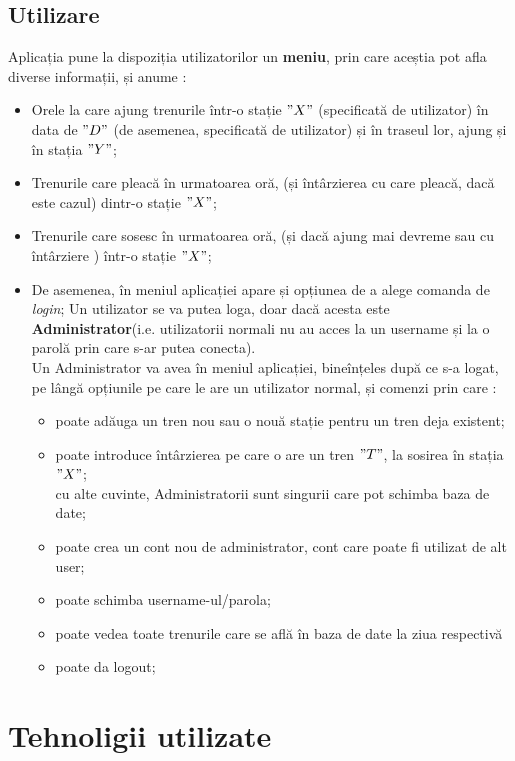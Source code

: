 \documentclass[runningheads]{llncs}
\begin{document}
\subsection{Utilizare}
Aplicația pune la dispoziția utilizatorilor un \textbf{meniu}, prin care aceștia pot afla diverse informații, și anume :
\begin{itemize}
	\itemsep0em
	\item Orele la care ajung trenurile într-o stație $" X "$ (specificată de utilizator) în data de $"D"$ (de asemenea, specificată de utilizator) și în traseul lor, ajung și în stația $"Y"$;
	\item Trenurile care pleacă în urmatoarea oră, (și întârzierea cu care pleacă, dacă este cazul) dintr-o stație $"X"$;
        \item Trenurile care sosesc în urmatoarea oră, (și dacă ajung mai devreme sau cu întârziere ) într-o stație $"X"$;
        \item De asemenea, în meniul aplicației apare și opțiunea de a alege comanda de \textit{login};
Un utilizator se va putea loga, doar dacă acesta este \textbf{Administrator}(i.e. utilizatorii normali nu au acces la un username și la o parolă prin care s-ar putea conecta).\\
       Un Administrator va avea în meniul aplicației, bineînțeles după ce s-a logat, pe lângă opțiunile pe care le are un utilizator normal, și comenzi prin care :
	\begin{itemize}
		\itemsep0em
		\item poate adăuga un tren nou sau o nouă stație pentru un tren deja existent;
		\item poate introduce întârzierea pe care o are un tren $"T"$, la sosirea în stația $"X"$;\\ cu alte cuvinte, Administratorii sunt singurii care pot schimba baza de date;
		\item poate crea un cont nou de administrator, cont care poate fi utilizat de alt user;
            \item poate schimba username-ul/parola;
            \item poate vedea toate trenurile care se află în baza de date la ziua respectivă
            \item poate da logout;
	\end{itemize}
\end{itemize}
 \section{Tehnoligii utilizate}
\end{document}
